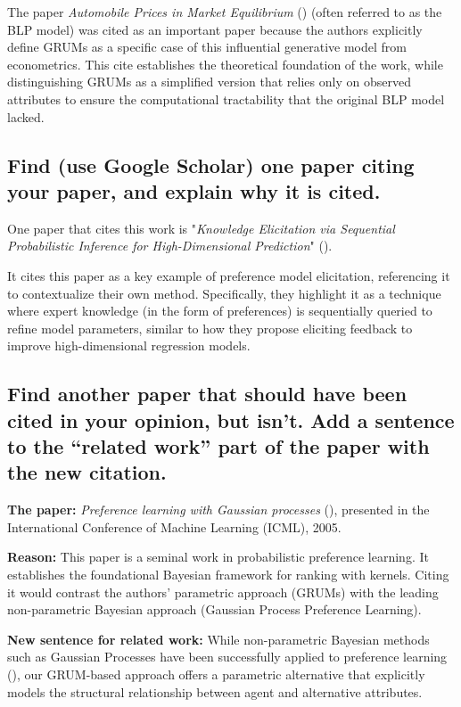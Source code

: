 The paper \textit{Automobile Prices in Market Equilibrium} (\cite{berry1993automobile}) (often referred to as the BLP model) was cited as an important paper because the authors explicitly define GRUMs as a specific case of this influential generative model from econometrics.
This cite establishes the theoretical foundation of the work, while distinguishing GRUMs as a simplified version that relies only on observed attributes to ensure the computational tractability that the original BLP model lacked.

\subsection{
    Find (use Google Scholar) one paper citing your paper, and explain why it is cited.
}

One paper that cites this work is "\textit{Knowledge Elicitation via Sequential Probabilistic Inference for High-Dimensional Prediction}" (\cite{daee2017knowledge}).

It cites this paper as a key example of preference model elicitation, referencing it to contextualize their own method.
Specifically, they highlight it as a technique where expert knowledge (in the form of preferences) is sequentially queried to refine model parameters, similar to how they propose eliciting feedback to improve high-dimensional regression models.

\subsection{
    Find another paper that should have been cited in your opinion, but isn’t.
    Add a sentence to the “related work” part of the paper with the new citation.
}

\textbf{The paper:}
\textit{Preference learning with Gaussian processes} (\cite{chu2005preference}), presented in the International Conference of Machine Learning (ICML), 2005.

\textbf{Reason:}
This paper is a seminal work in probabilistic preference learning.
It establishes the foundational Bayesian framework for ranking with kernels.
Citing it would contrast the authors' parametric approach (GRUMs) with the leading non-parametric Bayesian approach (Gaussian Process Preference Learning).

\textbf{New sentence for related work:} 
While non-parametric Bayesian methods such as Gaussian Processes have been successfully applied to preference learning (\cite{chu2005preference}), our GRUM-based approach offers a parametric alternative that explicitly models the structural relationship between agent and alternative attributes.